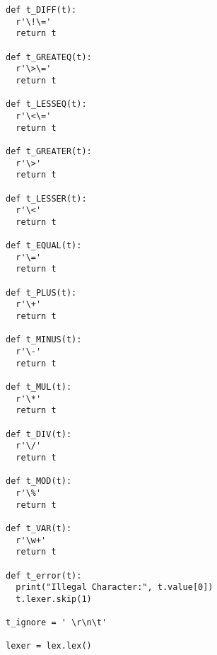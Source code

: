 \documentclass[11pt,a4paper]{report}%
\begin{document}
\begin{scriptsize}
\begin{verbatim}
def t_DIFF(t):
  r'\!\='
  return t

def t_GREATEQ(t):
  r'\>\='
  return t

def t_LESSEQ(t):
  r'\<\='
  return t

def t_GREATER(t):
  r'\>'
  return t

def t_LESSER(t):
  r'\<'
  return t

def t_EQUAL(t):
  r'\='
  return t

def t_PLUS(t):
  r'\+'
  return t

def t_MINUS(t):
  r'\-'
  return t

def t_MUL(t):
  r'\*'
  return t

def t_DIV(t):
  r'\/'
  return t

def t_MOD(t):
  r'\%'
  return t

def t_VAR(t):
  r'\w+'
  return t

def t_error(t):
  print("Illegal Character:", t.value[0])
  t.lexer.skip(1)

t_ignore = ' \r\n\t'

lexer = lex.lex()

\end{verbatim}
\end{scriptsize}
\end{document}
